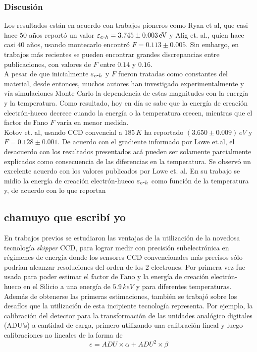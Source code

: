 \subsubsection{Discusión}
Los resultados están en acuerdo con trabajos pioneros como Ryan et al, que casi hace 50 años reportó un valor $\varepsilon_{\eh} = 3.745 \pm 0.003\,\si{eV}$ y Alig et. al., quien hace casi $40$ años, usando montecarlo encontró $F = 0.113 \pm 0.005$. Sin embargo, en trabajos más recientes se pueden encontrar grandes discrepancias entre publicaciones, con valores de $F$ entre $0.14$ y $0.16$.\\
\indent A pesar de que inicialmente $\varepsilon_{\eh}$ y $F$ fueron tratadas como constantes del material, desde entonces, muchos autores han investigado experimentalmente y vía simulaciones Monte Carlo la dependencia de estas magnitudes con la energía y la temperatura. Como resultado, hoy en día se sabe que la energía de creación electrón-hueco decrece cuando la energía o la temperatura crecen, mientras que el factor de Fano $F$ varía en menor medida.\\
\indent Kotov et. al, usando CCD convencial a $185\,\si{K}$ ha reportado $(3.650 \pm 0.009)\,\si{eV}$ y $F = 0.128 \pm 0.001$. De acuerdo con el gradiente informado por Lowe et.al, el desacuerdo con los resultados presentados acá pueden ser solamente parcialmente explicados como consecuencia de las diferencias en la temperatura. Se observó un excelente acuerdo con los valores publicados por Lowe et. al. En su trabajo se midio la energía de creación electrón-hueco $\varepsilon_{\eh}$ como función de la temperatura y, de acuerdo con lo que reportan


\subsection{chamuyo que escribí yo}
\noindent En trabajos previos se estudiaron las ventajas de la utilización de la novedosa tecnología \textit{skipper} CCD, para lograr medir con precisión subelectrónica en régimenes de energía donde los sensores CCD convencionales más precisos sólo podrían alcanzar resoluciones del orden de los $2$ electrones. Por primera vez fue usada para poder estimar el factor de Fano y la energía de creación electrón-hueco en el Silicio a una energía de $5.9\,\si{keV}$ y para diferentes temperaturas. Además de obtenerse las primeras estimaciones, también se trabajó sobre los desafíos que la utilización de esta incipiente tecnología representa. Por ejemplo, la calibración del detector para la transformación de las unidades analógico digitales (ADU's) a cantidad de carga, primero utilizando una calibración lineal y luego calibraciones no lineales de la forma de
\begin{equation*}
    e = ADU \times \alpha + ADU^{2} \times \beta
\end{equation*}

